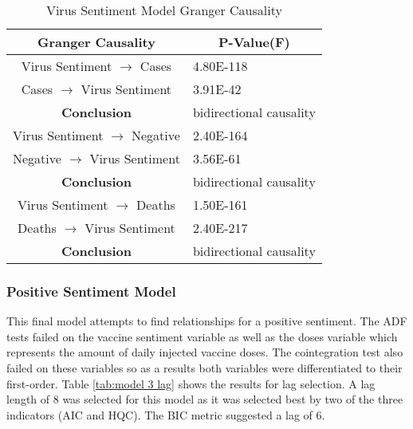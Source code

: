 \begin{table}[H]
\centering
\begin{tabular}{@{}cl@{}}
\toprule
\textbf{Granger Causality} & \multicolumn{1}{c}{\textbf{P-Value(F)}} \\ \midrule
Virus Sentiment $\rightarrow$ Cases & 4.80E-118 \\
Cases $\rightarrow$ Virus Sentiment & 3.91E-42 \\
\textbf{Conclusion} & \multicolumn{1}{r}{bidirectional causality} \\
Virus Sentiment $\rightarrow$ Negative & 2.40E-164 \\
Negative $\rightarrow$ Virus Sentiment & 3.56E-61 \\
\textbf{Conclusion} & \multicolumn{1}{r}{bidirectional causality} \\
Virus Sentiment $\rightarrow$ Deaths & 1.50E-161 \\
Deaths $\rightarrow$ Virus Sentiment & 2.40E-217 \\
\textbf{Conclusion} & \multicolumn{1}{r}{bidirectional causality} \\
\bottomrule
\end{tabular}
\caption{Virus Sentiment Model Granger Causality}
\label{tab:model 2 causality}
\end{table}

\subsubsection{Positive Sentiment Model}

This final model attempts to find relationships for a positive sentiment. The ADF tests failed on the vaccine sentiment variable as well as the doses variable which represents the amount of daily injected vaccine doses. The cointegration test also failed on these variables so as a results both variables were differentiated to their first-order. Table \ref{tab:model 3 lag} shows the results for lag selection. A lag length of 8 was selected for this model as it was selected best by two of the three indicators (AIC and HQC). The BIC metric suggested a lag of 6.

